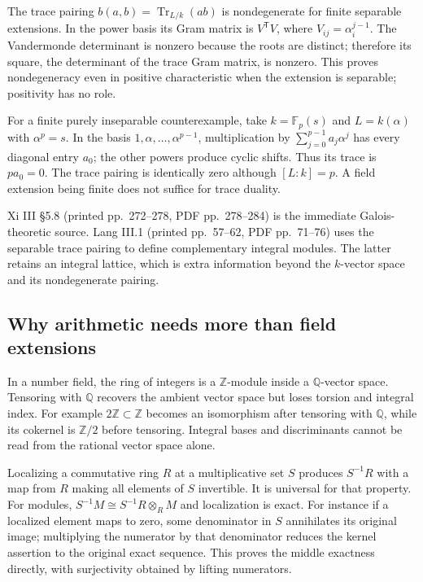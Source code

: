 \documentclass[
  11pt,
]{article}
\begin{document}
The trace pairing \(b(a,b)=\operatorname{Tr}_{L/k}(ab)\) is
nondegenerate for finite separable extensions. In the power basis its
Gram matrix is \(V^{\mathsf T}V\), where \(V_{ij}=\alpha_i^{j-1}\). The
Vandermonde determinant is nonzero because the roots are distinct;
therefore its square, the determinant of the trace Gram matrix, is
nonzero. This proves nondegeneracy even in positive characteristic when
the extension is separable; positivity has no role.

For a finite purely inseparable counterexample, take
\(k=\mathbb F_p(s)\) and \(L=k(\alpha)\) with \(\alpha^p=s\). In the
basis \(1,\alpha,\ldots,\alpha^{p-1}\), multiplication by
\(\sum_{j=0}^{p-1}a_j\alpha^j\) has every diagonal entry \(a_0\); the
other powers produce cyclic shifts. Thus its trace is \(pa_0=0\). The
trace pairing is identically zero although \([L:k]=p\). A field
extension being finite does not suffice for trace duality.

Xi III §5.8 (printed pp.~272--278, PDF pp.~278--284) is the immediate
Galois-theoretic source. Lang III.1 (printed pp.~57--62, PDF pp.~71--76)
uses the separable trace pairing to define complementary integral
modules. The latter retains an integral lattice, which is extra
information beyond the \(k\)-vector space and its nondegenerate pairing.

\subsection{Why arithmetic needs more than field
extensions}\label{why-arithmetic-needs-more-than-field-extensions}

In a number field, the ring of integers is a \(\mathbb Z\)-module inside
a \(\mathbb Q\)-vector space. Tensoring with \(\mathbb Q\) recovers the
ambient vector space but loses torsion and integral index. For example
\(2\mathbb Z\subset\mathbb Z\) becomes an isomorphism after tensoring
with \(\mathbb Q\), while its cokernel is \(\mathbb Z/2\) before
tensoring. Integral bases and discriminants cannot be read from the
rational vector space alone.

Localizing a commutative ring \(R\) at a multiplicative set \(S\)
produces \(S^{-1}R\) with a map from \(R\) making all elements of \(S\)
invertible. It is universal for that property. For modules,
\(S^{-1}M\cong S^{-1}R\otimes_R M\) and localization is exact. For
instance if a localized element maps to zero, some denominator in \(S\)
annihilates its original image; multiplying the numerator by that
denominator reduces the kernel assertion to the original exact sequence.
This proves the middle exactness directly, with surjectivity obtained by
lifting numerators.
\end{document}
